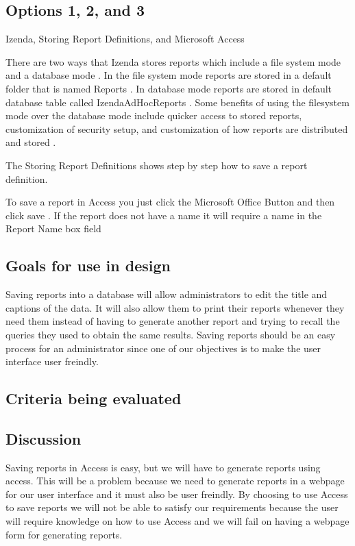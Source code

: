 \documentclass[12pt, draftclsnofoot, onecolumn]{IEEEtran}
\begin{document}
\subsection{Options 1, 2, and 3}
Izenda, Storing Report Definitions, and Microsoft Access

There are two ways that Izenda stores reports which include a file system mode and a database mode \cite{Adams}. In the file system mode reports are stored in a default folder that is named Reports \cite{Adams}. In database mode reports are stored in default database table called IzendaAdHocReports \cite{}. Some benefits of using the filesystem mode over the database mode include quicker access to stored reports, customization of security setup, and customization of how reports are distributed and stored \cite{Adams}. 

The Storing Report Definitions shows step by step how to save a report definition. 

To save a report in Access you just click the Microsoft Office Button and then click save \cite{SimpleReport}. If the report does not have a name it will require a name in the Report Name box field \cite{SimpleReport}

\subsection{Goals for use in design}
Saving reports into a database will allow administrators to edit the title and captions of the data. It will also allow them to print their reports whenever they need them instead of having to generate another report and trying to recall the queries they used to obtain the same results. Saving reports should be an easy process for an administrator since one of our objectives is to make the user interface user freindly. 
\subsection{Criteria being evaluated}

\subsection{Discussion}
Saving reports in Access is easy, but we will have to generate reports using access. This will be a problem because we need to generate reports in a webpage for our user interface and it must also be user freindly. By choosing to use Access to save reports we will not be able to satisfy our requirements because the user will require knowledge on how to use Access and we will fail on having a webpage form for generating reports. 
\end{document}
